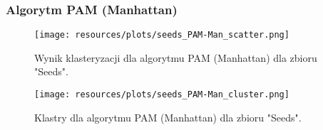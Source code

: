   \subsubsection{Algorytm PAM (Manhattan)} 
    \begin{figure}[H]
      \center
      \texttt{[image: resources/plots/seeds\_PAM-Man\_scatter.png]}
      \caption{Wynik klasteryzacji dla algorytmu PAM (Manhattan) dla zbioru "Seeds".}
    \end{figure}
    \begin{figure}[H]
      \center
      \texttt{[image: resources/plots/seeds\_PAM-Man\_cluster.png]}
      \caption{Klastry dla algorytmu PAM (Manhattan) dla zbioru "Seeds".}
    \end{figure}
